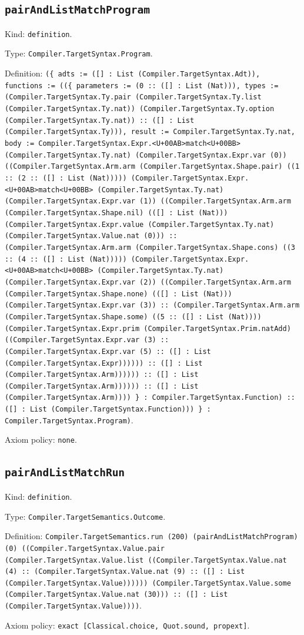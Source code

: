 \documentclass[11pt]{article}
\begin{document}
\subsection*{\texttt{pairAndListMatchProgram}}
\noindent Kind: \texttt{definition}.\par
\noindent Type: \texttt{Compiler.TargetSyntax.Program}.\par
\noindent Definition: \texttt{(\{ adts := ([] : List (Compiler.TargetSyntax.Adt)), functions := ((\{ parameters := (0 :: ([] : List (Nat))), types := (Compiler.TargetSyntax.Ty.pair (Compiler.TargetSyntax.Ty.list (Compiler.TargetSyntax.Ty.nat)) (Compiler.TargetSyntax.Ty.option (Compiler.TargetSyntax.Ty.nat)) :: ([] : List (Compiler.TargetSyntax.Ty))), result := Compiler.TargetSyntax.Ty.nat, body := Compiler.TargetSyntax.Expr.<U+00AB>match<U+00BB> (Compiler.TargetSyntax.Ty.nat) (Compiler.TargetSyntax.Expr.var (0)) ((Compiler.TargetSyntax.Arm.arm (Compiler.TargetSyntax.Shape.pair) ((1 :: (2 :: ([] : List (Nat))))) (Compiler.TargetSyntax.Expr.<U+00AB>match<U+00BB> (Compiler.TargetSyntax.Ty.nat) (Compiler.TargetSyntax.Expr.var (1)) ((Compiler.TargetSyntax.Arm.arm (Compiler.TargetSyntax.Shape.nil) (([] : List (Nat))) (Compiler.TargetSyntax.Expr.value (Compiler.TargetSyntax.Ty.nat) (Compiler.TargetSyntax.Value.nat (0))) :: (Compiler.TargetSyntax.Arm.arm (Compiler.TargetSyntax.Shape.cons) ((3 :: (4 :: ([] : List (Nat))))) (Compiler.TargetSyntax.Expr.<U+00AB>match<U+00BB> (Compiler.TargetSyntax.Ty.nat) (Compiler.TargetSyntax.Expr.var (2)) ((Compiler.TargetSyntax.Arm.arm (Compiler.TargetSyntax.Shape.none) (([] : List (Nat))) (Compiler.TargetSyntax.Expr.var (3)) :: (Compiler.TargetSyntax.Arm.arm (Compiler.TargetSyntax.Shape.some) ((5 :: ([] : List (Nat)))) (Compiler.TargetSyntax.Expr.prim (Compiler.TargetSyntax.Prim.natAdd) ((Compiler.TargetSyntax.Expr.var (3) :: (Compiler.TargetSyntax.Expr.var (5) :: ([] : List (Compiler.TargetSyntax.Expr)))))) :: ([] : List (Compiler.TargetSyntax.Arm)))))) :: ([] : List (Compiler.TargetSyntax.Arm)))))) :: ([] : List (Compiler.TargetSyntax.Arm)))) \} : Compiler.TargetSyntax.Function) :: ([] : List (Compiler.TargetSyntax.Function))) \} : Compiler.TargetSyntax.Program)}.\par
\noindent Axiom policy: \texttt{none}.\par
\subsection*{\texttt{pairAndListMatchRun}}
\noindent Kind: \texttt{definition}.\par
\noindent Type: \texttt{Compiler.TargetSemantics.Outcome}.\par
\noindent Definition: \texttt{Compiler.TargetSemantics.run (200) (pairAndListMatchProgram) (0) ((Compiler.TargetSyntax.Value.pair (Compiler.TargetSyntax.Value.list ((Compiler.TargetSyntax.Value.nat (4) :: (Compiler.TargetSyntax.Value.nat (9) :: ([] : List (Compiler.TargetSyntax.Value)))))) (Compiler.TargetSyntax.Value.some (Compiler.TargetSyntax.Value.nat (30))) :: ([] : List (Compiler.TargetSyntax.Value))))}.\par
\noindent Axiom policy: \texttt{exact [Classical.choice, Quot.sound, propext]}.\par
\end{document}
